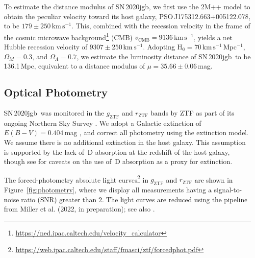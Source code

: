 \documentclass[twocolumn]{aastex631}
\newcommand{\sn}{SN\,2020jgb}
\newcommand{\kms}{$\mathrm{km}\,\mathrm{s}^{-1}$}
\begin{document}
\begin{CJK*}{UTF8}{gbsn}
To estimate the distance modulus of \sn, we first use the 2M++ model \citep{Carrick2015_2M++} to obtain the peculiar velocity toward its host galaxy, PSO\,J175312.663+005122.078, to be $179\pm250$\,\kms. This, combined with the recession velocity in the frame of the cosmic microwave background\footnote{\url{https://ned.ipac.caltech.edu/velocity_calculator}} (CMB) $v_\mathrm{CMB}=9136$\,\kms, yields a net Hubble recession velocity of $9307\pm250$\,\kms. Adopting H$_0=70$\,\kms\,Mpc$^{-1}$, $\Omega_M=0.3$, and $\Omega_\Lambda=0.7$, we estimate the luminosity distance of \sn\ to be 136.1\,Mpc, equivalent to a distance modulus of $\mu=35.66\pm0.06$\,mag.

\subsection{Optical Photometry}
\sn\ was monitored in the $g_\mathrm{ZTF}$ and $r_\mathrm{ZTF}$ bands by ZTF as part of its ongoing Northern Sky Survey \citep{Bellm_ZTF_2019b}. We adopt a Galactic extinction of $E(B-V)=0.404\,$mag \citep{Schlafly2011}, and correct all photometry using the \citet{Fitzpatrick1999} extinction model. We assume there is no additional extinction in the host galaxy. This assumption is supported by the lack of \,D absorption at the redshift of the host galaxy, though see \citet{Poznanski_2011} for caveats on the use of \,D absorption as a proxy for extinction. 

The forced-photometry absolute light curves\footnote{\url{https://web.ipac.caltech.edu/staff/fmasci/ztf/forcedphot.pdf}} in $g_\mathrm{ZTF}$ and $r_\mathrm{ZTF}$ are shown in Figure~\ref{fig:photometry}, where we display all measurements having a signal-to-noise ratio (SNR) greater than 2. The light curves are reduced using the pipeline from Miller et al. (2022, in preparation); see also \citet{Yao_2019}.


\end{CJK*}
\end{document}
